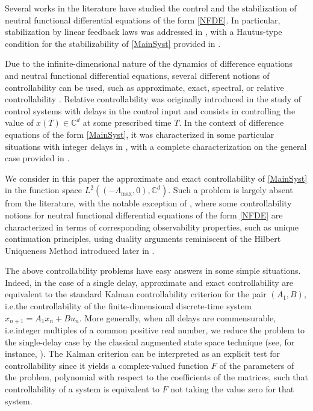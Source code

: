 \documentclass[10pt]{amsart}
\theoremstyle{plain}
\theoremstyle{definition}
\providecommand{\ie}{i.e.}\providecommand{\etc}{etc.}\providecommand{\resp}{resp.}\providecommand{\cf}{cf.}
\begin{document}
Several works in the literature have studied the control and the stabilization of neutral functional differential equations of the form \eqref{NFDE}. In particular, stabilization by linear feedback laws was addressed in \cite{Pandolfi1976Stabilization, Hale2002Strong, OConnor1983Stabilization}, with a Hautus-type condition for the stabilizability of \eqref{MainSyst} provided in \cite{Hale2002Strong}.

Due to the infinite-dimensional nature of the dynamics of difference equations and neutral functional differential equations, several different notions of controllability can be used, such as approximate, exact, spectral, or relative controllability \cite{Salamon1984Control, Chyung1970Controllability, Diblik2008Controllability, Pospisil2015Relative, Mazanti2017Relative}. Relative controllability was originally introduced in the study of control systems with delays in the control input \cite{Chyung1970Controllability} and consists in controlling the value of $x(T) \in \mathbb C^d$ at some prescribed time $T$. In the context of difference equations of the form \eqref{MainSyst}, it was characterized in some particular situations with integer delays in \cite{Diblik2008Controllability, Pospisil2015Relative}, with a complete characterization on the general case provided in \cite{Mazanti2017Relative}.

We consider in this paper the approximate and exact controllability of \eqref{MainSyst} in the function space $L^2((-\Lambda_{\max}, 0), \mathbb C^d)$. Such a problem is largely absent from the literature, with the notable exception of \cite{Salamon1984Control, OConnor1983Function}, where some controllability notions for neutral functional differential equations of the form \eqref{NFDE} are characterized in terms of corresponding observability properties, such as unique continuation principles, using duality arguments reminiscent of the Hilbert Uniqueness Method introduced later in \cite{Lions1986Controlabilite, Lions1988Exact}.

The above controllability problems have easy answers in some simple situations. \hbox{Indeed}, in the case of a single delay, approximate and exact controllability are equivalent to the standard Kalman controllability criterion for the pair $(A_1, B)$, \ie the controllability of the finite-dimensional discrete-time system $x_{n+1} = A_1 x_n + B u_n$. More generally, when all delays are commensurable, \ie integer multiples of a common positive real number, we reduce the problem to the single-delay case by the classical augmented state space technique (see, for instance, \cite[Chap.\,4]{Franklin1997Digital}). The Kalman criterion can be interpreted as an explicit test for controllability since it yields a complex-valued function $F$ of the parameters of the problem, polynomial with respect to the coefficients of the matrices, such that controllability of a system is equivalent to $F$ not taking the value zero for that system.
\end{document}
